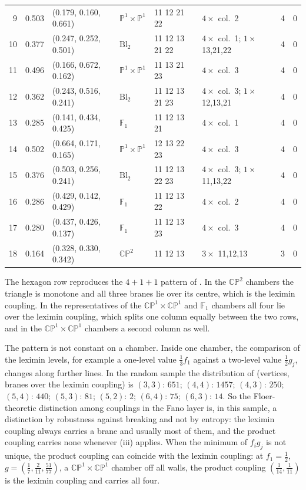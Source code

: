\documentclass[11pt]{article}
\theoremstyle{definition}
\theoremstyle{remark}
\begin{document}
\begin{table}[ht]
\begin{tabular}{rlllllcc}
9 & 0.503 & (0.179, 0.160, 0.661) & $\mathbb{P}^1{\times}\mathbb{P}^1$ & 11 12 21 22 & $4\times$ col.~2 & 4 & 0\\
10 & 0.377 & (0.247, 0.252, 0.501) & $\mathrm{Bl}_2$ & 11 12 13 21 22 & $4\times$ col.~1; $1\times$ 13,21,22 & 4 & 0\\
11 & 0.496 & (0.166, 0.672, 0.162) & $\mathbb{P}^1{\times}\mathbb{P}^1$ & 11 13 21 23 & $4\times$ col.~3 & 4 & 0\\
12 & 0.362 & (0.243, 0.516, 0.241) & $\mathrm{Bl}_2$ & 11 12 13 21 23 & $4\times$ col.~3; $1\times$ 12,13,21 & 4 & 0\\
13 & 0.285 & (0.141, 0.434, 0.425) & $\mathbb F_1$ & 11 12 13 21 & $4\times$ col.~1 & 4 & 0\\
14 & 0.502 & (0.664, 0.171, 0.165) & $\mathbb{P}^1{\times}\mathbb{P}^1$ & 12 13 22 23 & $4\times$ col.~3 & 4 & 0\\
15 & 0.376 & (0.503, 0.256, 0.241) & $\mathrm{Bl}_2$ & 11 12 13 22 23 & $4\times$ col.~3; $1\times$ 11,13,22 & 4 & 0\\
16 & 0.286 & (0.429, 0.142, 0.429) & $\mathbb F_1$ & 11 12 13 22 & $4\times$ col.~2 & 4 & 0\\
17 & 0.280 & (0.437, 0.426, 0.137) & $\mathbb F_1$ & 11 12 13 23 & $4\times$ col.~3 & 4 & 0\\
18 & 0.164 & (0.328, 0.330, 0.342) & $\mathbb{CP}^2$ & 11 12 13 & $3\times$ 11,12,13 & 3 & 0\\
\bottomrule
\end{tabular}
\end{table}


The hexagon row reproduces the $4+1+1$ pattern of \cite[Obs.~10.10]{Conditionals}. In the $\mathbb{CP}^2$ chambers the triangle is monotone and
all three branes lie over its centre, which is the leximin coupling. In the representatives of the $\mathbb{CP}^1\times\mathbb{CP}^1$ and $\mathbb F_1$
chambers all four lie over the leximin coupling, which splits one column equally between the two rows, and in the $\mathbb{CP}^1\times\mathbb{CP}^1$
chambers a second column as well.

The pattern is not constant on a chamber. Inside one chamber, the comparison of the leximin levels, for example a one-level value $\frac13f_1$
against a two-level value $\frac12g_j$, changes along further lines. In the random sample the distribution of (vertices, branes over the leximin
coupling) is $(3,3)$: $651$; $(4,4)$: $1457$; $(4,3)$: $250$; $(5,4)$: $440$; $(5,3)$: $81$; $(5,2)$: $2$; $(6,4)$: $75$; $(6,3)$: $14$. So the
Floer-theoretic distinction among couplings in the Fano layer is, in this sample, a distinction by robustness against breaking and not by entropy:
the leximin coupling always carries a brane and usually most of them, and the product coupling carries none whenever (iii) applies. When the
minimum of $f_ig_j$ is not unique, the product coupling can coincide with the leximin coupling: at $f_1=\frac12$,
$g=(\frac17,\frac2{11},\frac{51}{77})$, a $\mathbb{CP}^1\times\mathbb{CP}^1$ chamber off all walls, the product coupling $(\frac1{14},\frac1{11})$ is the leximin
coupling and carries all four.
\end{document}
